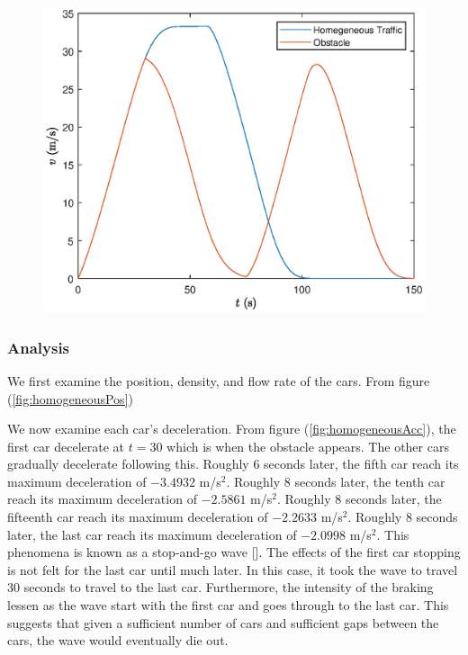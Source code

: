 \documentclass[12pt]{article}
\begin{document}
    \begin{figure}[H]
      \includegraphics[width=13cm]{BottleNeck7.eps}
      \centering
      \end{figure}

    \subsubsection{Analysis}
    We first examine the position, density, and flow rate of the cars. From figure (\ref{fig:homogeneousPos})

    We now examine each car's deceleration. From figure (\ref{fig:homogeneousAcc}), the first car decelerate at $t=30$ which is when the obstacle appears. The other cars gradually decelerate following this. Roughly $6$ seconds later, the fifth car reach its maximum deceleration of $-3.4932$ m/s$^2$. Roughly $8$ seconds later, the tenth car reach its maximum deceleration of $-2.5861$ m/s$^2$. Roughly $8$ seconds later, the fifteenth car reach its maximum deceleration of $-2.2633$ m/s$^2$. Roughly $8$ seconds later, the last car reach its maximum deceleration of $-2.0998$ m/s$^2$. This phenomena is known as a stop-and-go wave [\cite{traffic}]. The effects of the first car stopping is not felt for the last car until much later. In this case, it took the wave to travel $30$ seconds to travel to the last car. Furthermore, the intensity of the braking lessen as the wave start with the first car and goes through to the last car. This suggests that given a sufficient number of cars and sufficient gaps between the cars, the wave would eventually die out. 
\end{document}
